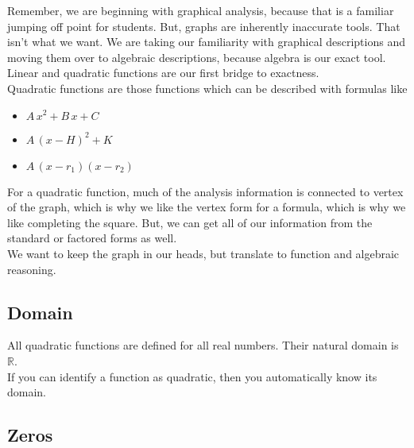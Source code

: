 \documentclass{ximera}
\begin{document}
Remember, we are beginning with graphical analysis, because that is a familiar jumping off point for students.  But, graphs are inherently inaccurate tools.  That isn't what we want. We are taking our familiarity with graphical descriptions and moving them over to algebraic descriptions, because algebra is our exact tool. \\

Linear and quadratic functions are our first bridge to exactness. \\


Quadratic functions are those functions which can be described with formulas like

\begin{itemize}
     \item $A \, x^2 + B \, x + C$
     \item $A \, (x - H)^2 + K$
     \item $A \, (x - r_1) (x-r_2)$
\end{itemize}

For a quadratic function, much of the analysis information is connected to vertex of the graph, which is why we like the vertex form for a formula, which is why we like completing the square.  But, we can get all of our information from the standard or factored forms as well. \\

We want to keep the graph in our heads, but translate to function and algebraic reasoning. \\





\subsection*{Domain} 

All quadratic functions are defined for all real numbers.  Their natural domain is $\mathbb{R}$. \\

If you can identify a function as quadratic, then you automatically know its domain. \\











\subsection*{Zeros}
\end{document}
